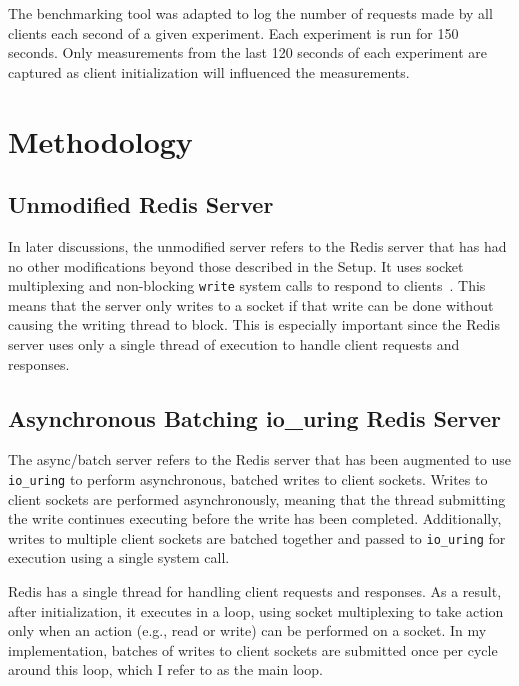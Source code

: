 \documentclass[sigconf]{acmart}
\newcommand{\inlinecode}[1]{\texttt{#1}}
\begin{document}
The benchmarking tool was adapted to log the number of requests made by all clients each second of a given experiment.
Each experiment is run for 150 seconds.
Only measurements from the last 120 seconds of each experiment are captured as client initialization will influenced the measurements.


\section{Methodology}
\subsection{Unmodified Redis Server}
In later discussions, the unmodified server refers to the Redis server that has had no other modifications beyond those described in the Setup.
It uses socket multiplexing and non-blocking \inlinecode{write} system calls to respond to clients~\cite{redis-client}.
This means that the server only writes to a socket if that write can be done without causing the writing thread to block.
This is especially important since the Redis server uses only a single thread of execution to handle client requests and responses.

\subsection {Asynchronous Batching io\_uring Redis Server}
The async/batch server refers to the Redis server that has been augmented to use \inlinecode{io\_uring} to perform asynchronous, batched writes to client sockets.
Writes to client sockets are performed asynchronously, meaning that the thread submitting the write continues executing before the write has been completed.
Additionally, writes to multiple client sockets are batched together and passed to \inlinecode{io\_uring} for execution using a single system call.

Redis has a single thread for handling client requests and responses.
As a result, after initialization, it executes in a loop, using socket multiplexing to take action only when an action (e.g., read or write) can be performed on a socket.
In my implementation, batches of writes to client sockets are submitted once per cycle around this loop, which I refer to as the main loop.

\end{document}
